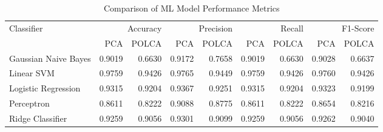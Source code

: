 \begin{table}[htbp]
\caption{Comparison of ML Model Performance Metrics}
\label{tab:model_comparison}
\begin{tabular}{lrrrrrrrr}
\toprule
Classifier & \multicolumn{2}{r}{Accuracy} & \multicolumn{2}{r}{Precision} & \multicolumn{2}{r}{Recall} & \multicolumn{2}{r}{F1-Score} \\
 & PCA & POLCA & PCA & POLCA & PCA & POLCA & PCA & POLCA \\
\midrule
Gaussian Naive Bayes & 0.9019 & 0.6630 & 0.9172 & 0.7658 & 0.9019 & 0.6630 & 0.9028 & 0.6637 \\
Linear SVM & 0.9759 & 0.9426 & 0.9765 & 0.9449 & 0.9759 & 0.9426 & 0.9760 & 0.9426 \\
Logistic Regression & 0.9315 & 0.9204 & 0.9367 & 0.9251 & 0.9315 & 0.9204 & 0.9323 & 0.9199 \\
Perceptron & 0.8611 & 0.8222 & 0.9088 & 0.8775 & 0.8611 & 0.8222 & 0.8654 & 0.8216 \\
Ridge Classifier & 0.9259 & 0.9056 & 0.9301 & 0.9099 & 0.9259 & 0.9056 & 0.9262 & 0.9040 \\
\bottomrule
\end{tabular}
\end{table}
